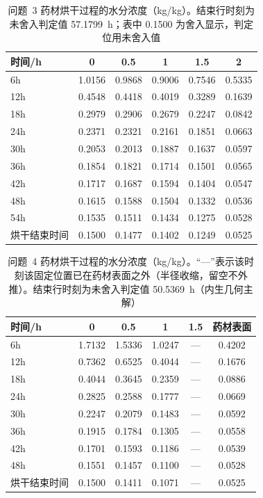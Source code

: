 \begin{table}[htbp]
\centering
\caption{问题~3 药材烘干过程的水分浓度（kg/kg）。结束行时刻为未舍入判定值 57.1799~h；表中 0.1500 为舍入显示，判定位用未舍入值}
\label{tab:表5}
\small
\begin{tabular}{lccccc}
\toprule
时间/h & 0 & 0.5 & 1 & 1.5 & 2 \\
\midrule
6h & 1.0156 & 0.9868 & 0.9006 & 0.7546 & 0.5335 \\
12h & 0.4548 & 0.4418 & 0.4019 & 0.3289 & 0.1639 \\
18h & 0.2979 & 0.2906 & 0.2679 & 0.2247 & 0.0842 \\
24h & 0.2371 & 0.2321 & 0.2161 & 0.1851 & 0.0663 \\
30h & 0.2053 & 0.2013 & 0.1887 & 0.1637 & 0.0597 \\
36h & 0.1854 & 0.1821 & 0.1714 & 0.1501 & 0.0565 \\
42h & 0.1717 & 0.1687 & 0.1594 & 0.1404 & 0.0547 \\
48h & 0.1615 & 0.1588 & 0.1504 & 0.1332 & 0.0536 \\
54h & 0.1535 & 0.1511 & 0.1434 & 0.1275 & 0.0528 \\
烘干结束时间 & 0.1500 & 0.1477 & 0.1402 & 0.1249 & 0.0525 \\
\bottomrule
\end{tabular}
\end{table}

\begin{table}[htbp]
\centering
\caption{问题~4 药材烘干过程的水分浓度（kg/kg）。“—”表示该时刻该固定位置已在药材表面之外（半径收缩，留空不外推）。结束行时刻为未舍入判定值 50.5369~h（内生几何主解）}
\label{tab:表6}
\small
\begin{tabular}{lccccc}
\toprule
时间/h & 0 & 0.5 & 1 & 1.5 & 药材表面 \\
\midrule
6h & 1.7132 & 1.5336 & 1.0247 & — & 0.4202 \\
12h & 0.7362 & 0.6525 & 0.4044 & — & 0.1676 \\
18h & 0.4044 & 0.3645 & 0.2359 & — & 0.0886 \\
24h & 0.2825 & 0.2588 & 0.1777 & — & 0.0669 \\
30h & 0.2247 & 0.2079 & 0.1483 & — & 0.0592 \\
36h & 0.1915 & 0.1784 & 0.1305 & — & 0.0558 \\
42h & 0.1701 & 0.1593 & 0.1186 & — & 0.0539 \\
48h & 0.1551 & 0.1457 & 0.1100 & — & 0.0528 \\
烘干结束时间 & 0.1500 & 0.1411 & 0.1071 & — & 0.0525 \\
\bottomrule
\end{tabular}
\end{table}